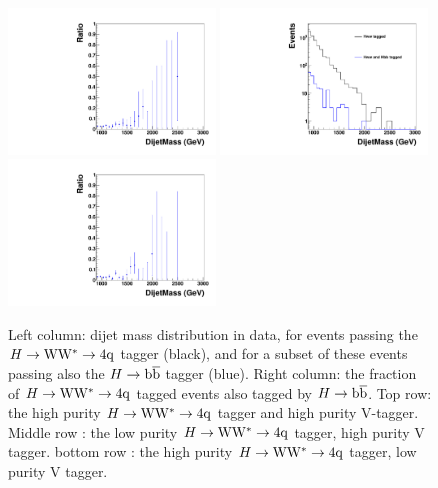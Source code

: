 \begin{figure}[ht]
\begin{center}
\includegraphics[width=0.49\textwidth, height=0.45\textwidth]{EXO-14-009/HqqqqZqqfigs/HbbHww/LowHPurityRatio.pdf}
\includegraphics[width=0.49\textwidth, height=0.45\textwidth]{EXO-14-009/HqqqqZqqfigs/HbbHww/LowVPurity.pdf}
\includegraphics[width=0.49\textwidth, height=0.45\textwidth]{EXO-14-009/HqqqqZqqfigs/HbbHww/LowVPurityRatio.pdf}
\end{center}
\caption{ 
  Left column: dijet mass distribution in data, for events passing the $H\to{\rm W}{\rm W}^*\to4{\rm q}$
  tagger (black), and for a subset of these events passing also 
  the $H\to\mathrm{b\overline{b}}$ tagger (blue).  Right column: the fraction of $H\to{\rm W}{\rm W}^*\to4{\rm q}$ tagged events
  also tagged by $H\to\mathrm{b\overline{b}}$.  Top row: the high purity $H\to{\rm W}{\rm W}^*\to4{\rm q}$ tagger 
  and high purity V-tagger.  
  Middle row : the low purity $H\to{\rm W}{\rm W}^*\to4{\rm q}$ tagger, high purity V tagger. 
  bottom row : the high purity $H\to{\rm W}{\rm W}^*\to4{\rm q}$ tagger, low purity V tagger. 
}
\label{fig:HbbRatio}
\end{figure}


\clearpage
